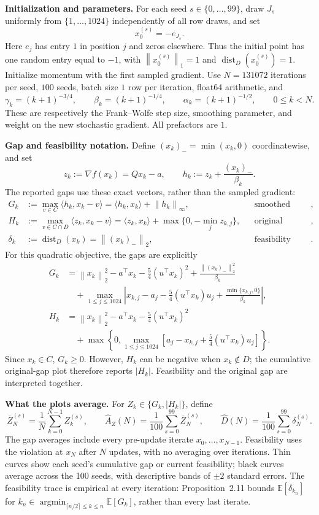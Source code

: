 \documentclass[10pt,a4paper]{article}
\newcommand{\E}{\mathbb E}
\newcommand{\ip}[2]{\langle #1,#2\rangle}
\newcommand{\norm}[1]{\left\|#1\right\|}
\DeclareMathOperator{\dist}{dist}
\begin{document}
\textbf{Initialization and parameters.} For each seed $s\in\{0,\ldots,99\}$, draw
$J_s$ uniformly from $\{1,\ldots,1024\}$ independently of all row draws, and set
\[
\boxed{x_0^{(s)}=-e_{J_s}.}
\]
Here $e_j$ has entry $1$ in position $j$ and zeros elsewhere. Thus the initial point
has one random entry equal to $-1$, with $\norm{x_0^{(s)}}_1=1$ and
$\dist_D(x_0^{(s)})=1$. Initialize momentum with the first sampled gradient.
Use $N=131072$ iterations per seed, $100$ seeds, batch size $1$ row per iteration,
float64 arithmetic, and
\[
\boxed{\gamma_k=(k+1)^{-3/4},\qquad
\beta_k=(k+1)^{-1/4},\qquad
\alpha_k=(k+1)^{-1/2},\qquad 0\le k<N.}
\]
These are respectively the Frank--Wolfe step size, smoothing parameter, and weight
on the new stochastic gradient. All prefactors are $1$.

\newpage
\textbf{Gap and feasibility notation.} Define $(x_k)_-=\min(x_k,0)$ coordinatewise,
and set
\[
z_k:=\nabla f(x_k)=Qx_k-a,\qquad h_k:=z_k+\frac{(x_k)_-}{\beta_k}.
\]
The reported gaps use these exact vectors, rather than the sampled gradient:
\begin{align*}
G_k
&:=\max_{v\in C}\ip{h_k}{x_k-v}
 =\boxed{\ip{h_k}{x_k}+\norm{h_k}_\infty},
&&\text{smoothed Frank--Wolfe gap},\\[3pt]
H_k
&:=\max_{v\in C\cap D}\ip{z_k}{x_k-v}
 =\boxed{\ip{z_k}{x_k}+\max\{0,-\min_jz_{k,j}\}},
&&\text{original constrained gap},\\[3pt]
\delta_k
&:=\dist_D(x_k)
 =\boxed{\norm{(x_k)_-}_2},
&&\text{feasibility violation}.
\end{align*}
For this quadratic objective, the gaps are explicitly
\[
\boxed{\begin{aligned}
G_k
&=\norm{x_k}_2^2-a^\top x_k-\frac54(u^\top x_k)^2
   +\frac{\norm{(x_k)_-}_2^2}{\beta_k}\\
&\quad+\max_{1\le j\le1024}\left|
 x_{k,j}-a_j-\frac54(u^\top x_k)u_j
 +\frac{\min\{x_{k,j},0\}}{\beta_k}\right|,\\[4pt]
H_k
&=\norm{x_k}_2^2-a^\top x_k-\frac54(u^\top x_k)^2\\
&\quad+\max\left\{0,\max_{1\le j\le1024}
 \left[a_j-x_{k,j}+\frac54(u^\top x_k)u_j\right]\right\}.
\end{aligned}}
\]
Since $x_k\in C$, $G_k\ge0$. However, $H_k$ can be negative when $x_k\notin D$;
the cumulative original-gap plot therefore reports $|H_k|$. Feasibility and the
original gap are interpreted together.

\textbf{What the plots average.} For $Z_k\in\{G_k,|H_k|\}$, define
\[
\overline Z_N^{(s)}=\frac1N\sum_{k=0}^{N-1}Z_k^{(s)},\qquad
\widehat A_Z(N)=\frac1{100}\sum_{s=0}^{99}\overline Z_N^{(s)},\qquad
\widehat D(N)=\frac1{100}\sum_{s=0}^{99}\delta_N^{(s)}.
\]
The gap averages include every pre-update iterate $x_0,\ldots,x_{N-1}$.
Feasibility uses the violation at $x_N$ after $N$ updates, with no averaging over iterations.
Thin curves show each seed's cumulative gap or current feasibility; black curves
average across the 100 seeds, with descriptive bands of $\pm2$ standard errors.
The feasibility trace is empirical at every iteration: Proposition~2.11 bounds
$\E[\delta_{k_n}]$ for $k_n\in\operatorname*{argmin}_{\lceil n/2\rceil\le k\le n}\E[G_k]$,
rather than every last iterate.
\end{document}
